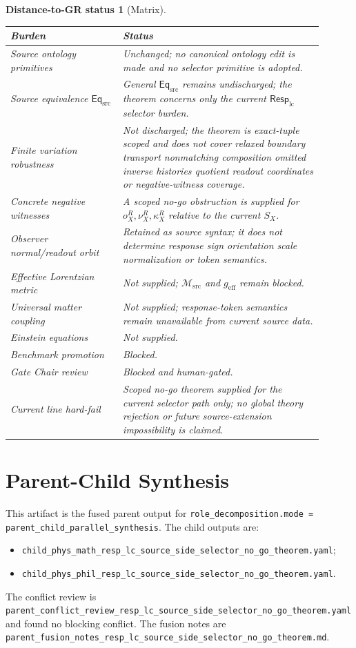 \documentclass[11pt]{article}
\newcommand{\EqSrc}{\mathsf{Eq}_{\mathrm{src}}}
\newcommand{\Msrc}{\mathcal{M}_{\mathrm{src}}}
\newcommand{\RespLC}{\mathsf{Resp}_{\mathrm{lc}}}
\newcommand{\geff}{g_{\mathrm{eff}}}
\newtheorem{distancestatus}{Distance-to-GR status}
\begin{document}
\begin{distancestatus}[Matrix]
\begin{center}
\small
\begin{tabular}{p{0.32\linewidth}p{0.58\linewidth}}
\hline
\textbf{Burden} & \textbf{Status} \\
\hline
Source ontology primitives & Unchanged; no canonical ontology edit is made and no selector primitive is adopted. \\
Source equivalence \(\EqSrc\) & General \(\EqSrc\) remains undischarged; the theorem concerns only the current \(\RespLC\) selector burden. \\
Finite variation robustness & Not discharged; the theorem is exact-tuple scoped and does not cover relaxed boundary transport nonmatching composition omitted inverse histories quotient readout coordinates or negative-witness coverage. \\
Concrete negative witnesses & A scoped no-go obstruction is supplied for \(o^R_X,\nu^R_X,\kappa^R_X\) relative to the current \(S_X\). \\
Observer normal/readout orbit & Retained as source syntax; it does not determine response sign orientation scale normalization or token semantics. \\
Effective Lorentzian metric & Not supplied; \(\Msrc\) and \(\geff\) remain blocked. \\
Universal matter coupling & Not supplied; response-token semantics remain unavailable from current source data. \\
Einstein equations & Not supplied. \\
Benchmark promotion & Blocked. \\
Gate Chair review & Blocked and human-gated. \\
Current line hard-fail & Scoped no-go theorem supplied for the current selector path only; no global theory rejection or future source-extension impossibility is claimed. \\
\hline
\end{tabular}
\end{center}
\end{distancestatus}

\section{Parent-Child Synthesis}

This artifact is the fused parent output for
\texttt{role\_decomposition.mode = parent\_child\_parallel\_synthesis}.
The child outputs are:
\begin{itemize}
    \item \texttt{child\_phys\_math\_resp\_lc\_source\_side\_selector\_no\_go\_theorem.yaml};
    \item \texttt{child\_phys\_phil\_resp\_lc\_source\_side\_selector\_no\_go\_theorem.yaml}.
\end{itemize}
The conflict review is
\texttt{parent\_conflict\_review\_resp\_lc\_source\_side\_selector\_no\_go\_theorem.yaml}
and found no blocking conflict. The fusion notes are
\texttt{parent\_fusion\_notes\_resp\_lc\_source\_side\_selector\_no\_go\_theorem.md}.
\end{document}
